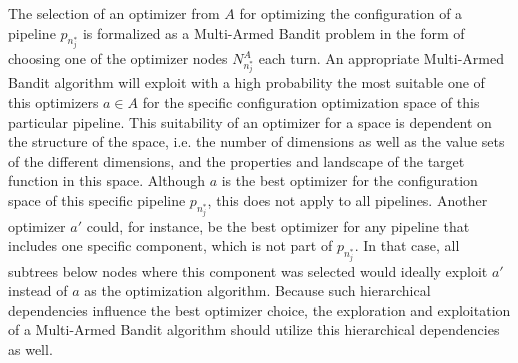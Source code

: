 The selection of an optimizer from $A$ for optimizing the configuration of a pipeline $p_{n^*_j}$ is formalized as a Multi-Armed Bandit problem in the form of choosing one of the optimizer nodes $N^A_{n^*_j}$ each turn.
An appropriate Multi-Armed Bandit algorithm will exploit with a high probability the most suitable one of this optimizers $a \in A$ for the specific configuration optimization space of this particular pipeline.
This suitability of an optimizer for a space is dependent on the structure of the space, i.e. the number of dimensions as well as the value sets of the different dimensions, and the properties and landscape of the target function in this space.\newline
Although $a$ is the best optimizer for the configuration space of this specific pipeline $p_{n^*_j}$, this does not apply to all pipelines.
Another optimizer $a'$ could, for instance, be the best optimizer for any pipeline that includes one specific component, which is not part of $p_{n^*_j}$.
In that case, all subtrees below nodes where this component was selected would ideally exploit $a'$ instead of $a$ as the optimization algorithm.
Because such hierarchical dependencies influence the best optimizer choice, the exploration and exploitation of a Multi-Armed Bandit algorithm should utilize this hierarchical dependencies as well.

